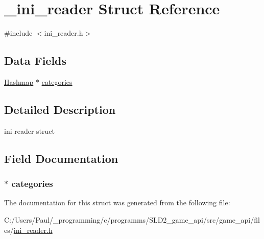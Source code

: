 \hypertarget{struct__ini__reader}{\section{\+\_\+ini\+\_\+reader Struct Reference}
\label{struct__ini__reader}
}


{\ttfamily \#include $<$ini\+\_\+reader.\+h$>$}

\subsection*{Data Fields}
\begin{DoxyCompactItemize}
\item 
\hyperlink{hashmap_8h_ad6df83529647c10a2add0472ff0ad367}{Hashmap} $\ast$ \hyperlink{struct__ini__reader_a46110e8812d9032f5e80334c85c23b39}{categories}
\end{DoxyCompactItemize}


\subsection{Detailed Description}
ini reader struct 

\subsection{Field Documentation}
\hypertarget{struct__ini__reader_a46110e8812d9032f5e80334c85c23b39}{
\subsubsection[{categories}]{$\ast$ categories}}\label{struct__ini__reader_a46110e8812d9032f5e80334c85c23b39}


The documentation for this struct was generated from the following file\+:\begin{DoxyCompactItemize}
\item 
C\+:/\+Users/\+Paul/\+\_\+programming/c/programms/\+S\+L\+D2\+\_\+game\+\_\+api/src/game\+\_\+api/files/\hyperlink{ini__reader_8h}{ini\+\_\+reader.\+h}\end{DoxyCompactItemize}
